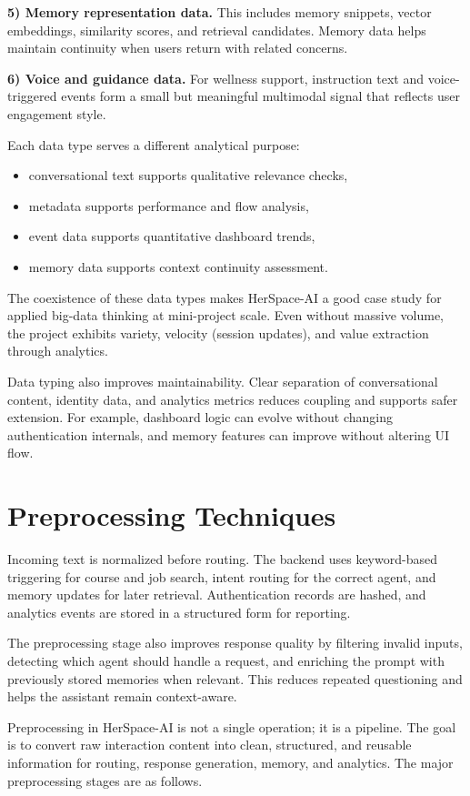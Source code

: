 \documentclass[oneside,a4paper,12pt]{report}
\begin{document}
\textbf{5) Memory representation data.} This includes memory snippets, vector embeddings, similarity scores, and retrieval candidates. Memory data helps maintain continuity when users return with related concerns.

\textbf{6) Voice and guidance data.} For wellness support, instruction text and voice-triggered events form a small but meaningful multimodal signal that reflects user engagement style.

Each data type serves a different analytical purpose:
\begin{itemize}
    \item conversational text supports qualitative relevance checks,
    \item metadata supports performance and flow analysis,
    \item event data supports quantitative dashboard trends,
    \item memory data supports context continuity assessment.
\end{itemize}

The coexistence of these data types makes HerSpace-AI a good case study for applied big-data thinking at mini-project scale. Even without massive volume, the project exhibits variety, velocity (session updates), and value extraction through analytics.

Data typing also improves maintainability. Clear separation of conversational content, identity data, and analytics metrics reduces coupling and supports safer extension. For example, dashboard logic can evolve without changing authentication internals, and memory features can improve without altering UI flow.

\section{Preprocessing Techniques}
Incoming text is normalized before routing. The backend uses keyword-based triggering for course and job search, intent routing for the correct agent, and memory updates for later retrieval. Authentication records are hashed, and analytics events are stored in a structured form for reporting.

The preprocessing stage also improves response quality by filtering invalid inputs, detecting which agent should handle a request, and enriching the prompt with previously stored memories when relevant. This reduces repeated questioning and helps the assistant remain context-aware.

Preprocessing in HerSpace-AI is not a single operation; it is a pipeline. The goal is to convert raw interaction content into clean, structured, and reusable information for routing, response generation, memory, and analytics. The major preprocessing stages are as follows.
\end{document}
